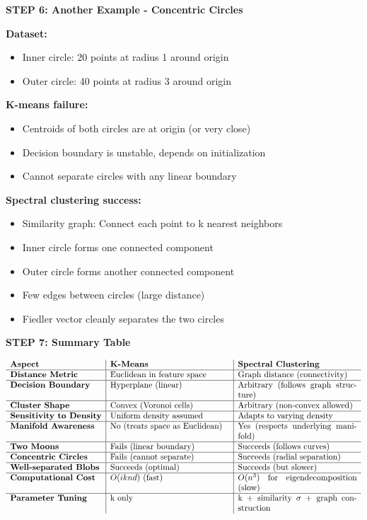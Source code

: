 \documentclass[12pt]{article}
\begin{document}
\begin{solution}
\textbf{STEP 6: Another Example - Concentric Circles}

\textbf{Dataset:}
\begin{itemize}
    \item Inner circle: 20 points at radius 1 around origin
    \item Outer circle: 40 points at radius 3 around origin
\end{itemize}

\textbf{K-means failure:}
\begin{itemize}
    \item Centroids of both circles are at origin (or very close)
    \item Decision boundary is unstable, depends on initialization
    \item Cannot separate circles with any linear boundary
\end{itemize}

\textbf{Spectral clustering success:}
\begin{itemize}
    \item Similarity graph: Connect each point to k nearest neighbors
    \item Inner circle forms one connected component
    \item Outer circle forms another connected component
    \item Few edges between circles (large distance)
    \item Fiedler vector cleanly separates the two circles
\end{itemize}

\textbf{STEP 7: Summary Table}

\[
\begin{array}{l|p{5cm}|p{5cm}}
\textbf{Aspect} & \textbf{K-Means} & \textbf{Spectral Clustering} \\
\hline
\textbf{Distance Metric} & Euclidean in feature space & Graph distance (connectivity) \\
\hline
\textbf{Decision Boundary} & Hyperplane (linear) & Arbitrary (follows graph structure) \\
\hline
\textbf{Cluster Shape} & Convex (Voronoi cells) & Arbitrary (non-convex allowed) \\
\hline
\textbf{Sensitivity to Density} & Uniform density assumed & Adapts to varying density \\
\hline
\textbf{Manifold Awareness} & No (treats space as Euclidean) & Yes (respects underlying manifold) \\
\hline
\textbf{Two Moons} & Fails (linear boundary) & Succeeds (follows curves) \\
\hline
\textbf{Concentric Circles} & Fails (cannot separate) & Succeeds (radial separation) \\
\hline
\textbf{Well-separated Blobs} & Succeeds (optimal) & Succeeds (but slower) \\
\hline
\textbf{Computational Cost} & $O(iknd)$ (fast) & $O(n^3)$ for eigendecomposition (slow) \\
\hline
\textbf{Parameter Tuning} & k only & k + similarity $\sigma$ + graph construction \\
\end{array}
\]


\end{solution}
\end{document}
